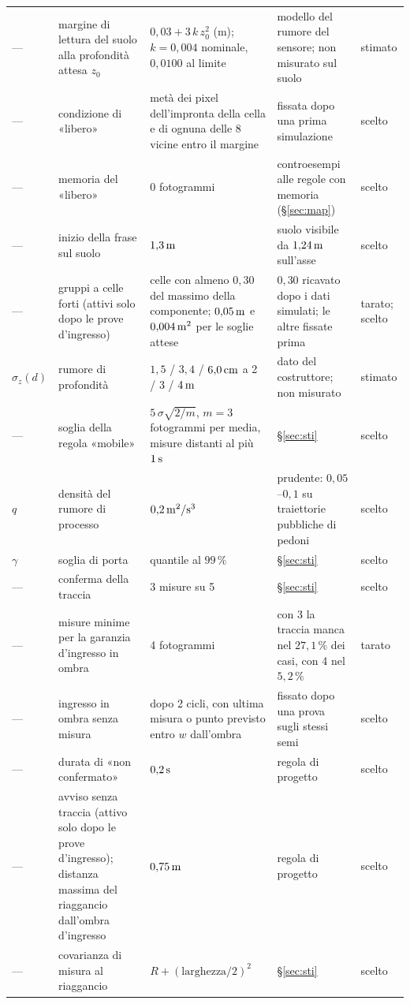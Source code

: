 \begin{table}[H]
\begin{tabularx}{\linewidth}{@{}p{1.25cm}Lp{3.5cm}Lp{1.2cm}@{}}
--- & margine di lettura del suolo alla profondità attesa $z_0$ & $0{,}03+3\,k\,z_0^2$ (m); $k=0{,}004$ nominale, $0{,}0100$ al limite & modello del rumore del sensore; non misurato sul suolo & stimato\\
--- & condizione di «libero» & metà dei pixel dell'impronta della cella e di ognuna delle 8 vicine entro il margine & fissata dopo una prima simulazione & scelto\\
--- & memoria del «libero» & 0 fotogrammi & controesempi alle regole con memoria (\S\ref{sec:map}) & scelto\\
--- & inizio della frase sul suolo & $1{,}3\,\mathrm{m}$ & suolo visibile da $1{,}24\,\mathrm{m}$ sull'asse & scelto\\
--- & gruppi a celle forti (attivi solo dopo le prove d'ingresso) & celle con almeno $0{,}30$ del massimo della componente; $0{,}05\,\mathrm{m}$ e $0{,}004\,\mathrm{m^2}$ per le soglie attese & $0{,}30$ ricavato dopo i dati simulati; le altre fissate prima & tarato; scelto\\
$\sigma_z(d)$ & rumore di profondità & $1{,}5$ / $3{,}4$ / $6{,}0\,\mathrm{cm}$ a 2 / 3 / $4\,\mathrm{m}$ & dato del costruttore; non misurato & stimato\\
--- & soglia della regola «mobile» & $5\,\sigma\sqrt{2/m}$, $m=3$ fotogrammi per media, misure distanti al più $1\,\mathrm{s}$ & \S\ref{sec:sti} & scelto\\
$q$ & densità del rumore di processo & $0{,}2\,\mathrm{m^2/s^3}$ & prudente: $0{,}05$--$0{,}1$ su traiettorie pubbliche di pedoni & scelto\\
$\gamma$ & soglia di porta & quantile al $99\,\%$ & \S\ref{sec:sti} & scelto\\
--- & conferma della traccia & 3 misure su 5 & \S\ref{sec:sti} & scelto\\
--- & misure minime per la garanzia d'ingresso in ombra & 4 fotogrammi & con 3 la traccia manca nel $27{,}1\,\%$ dei casi, con 4 nel $5{,}2\,\%$ & tarato\\
--- & ingresso in ombra senza misura & dopo 2 cicli, con ultima misura o punto previsto entro $w$ dall'ombra & fissato dopo una prova sugli stessi semi & scelto\\
--- & durata di «non confermato» & $0{,}2\,\mathrm{s}$ & regola di progetto & scelto\\
--- & avviso senza traccia (attivo solo dopo le prove d'ingresso); distanza massima del riaggancio dall'ombra d'ingresso & $0{,}75\,\mathrm{m}$ & regola di progetto & scelto\\
--- & covarianza di misura al riaggancio & $R+(\text{larghezza}/2)^2$ & \S\ref{sec:sti} & scelto\\
\bottomrule
\end{tabularx}
\end{table}

